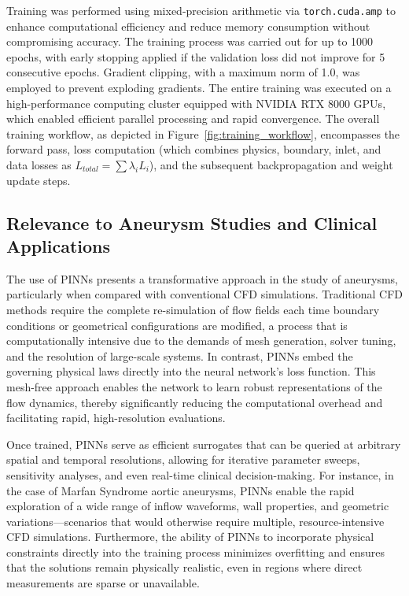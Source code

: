 \documentclass[12pt, a4paper]{article}
\begin{document}
Training was performed using mixed-precision arithmetic via \texttt{torch.cuda.amp} \citep{micikevicius2017mixed} to enhance computational efficiency and reduce memory consumption without compromising accuracy. The training process was carried out for up to 1000 epochs, with early stopping applied if the validation loss did not improve for 5 consecutive epochs. Gradient clipping, with a maximum norm of 1.0, was employed to prevent exploding gradients. The entire training was executed on a high-performance computing cluster equipped with NVIDIA RTX 8000 GPUs, which enabled efficient parallel processing and rapid convergence. The overall training workflow, as depicted in Figure~\ref{fig:training_workflow}, encompasses the forward pass, loss computation (which combines physics, boundary, inlet, and data losses as \(L_{total}=\sum \lambda_i L_i\)), and the subsequent backpropagation and weight update steps.


\subsection{Relevance to Aneurysm Studies and Clinical Applications}

The use of PINNs presents a transformative approach in the study of aneurysms, particularly when compared with conventional CFD simulations. Traditional CFD methods require the complete re-simulation of flow fields each time boundary conditions or geometrical configurations are modified, a process that is computationally intensive due to the demands of mesh generation, solver tuning, and the resolution of large-scale systems. In contrast, PINNs embed the governing physical laws directly into the neural network’s loss function. This mesh-free approach enables the network to learn robust representations of the flow dynamics, thereby significantly reducing the computational overhead and facilitating rapid, high-resolution evaluations.

Once trained, PINNs serve as efficient surrogates that can be queried at arbitrary spatial and temporal resolutions, allowing for iterative parameter sweeps, sensitivity analyses, and even real-time clinical decision-making. For instance, in the case of Marfan Syndrome aortic aneurysms, PINNs enable the rapid exploration of a wide range of inflow waveforms, wall properties, and geometric variations—scenarios that would otherwise require multiple, resource-intensive CFD simulations. Furthermore, the ability of PINNs to incorporate physical constraints directly into the training process minimizes overfitting and ensures that the solutions remain physically realistic, even in regions where direct measurements are sparse or unavailable.
\end{document}
